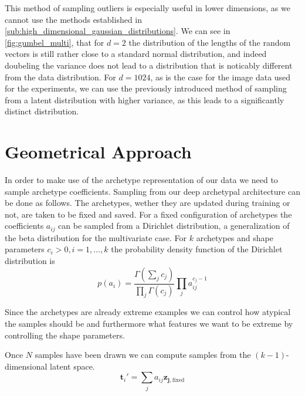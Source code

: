 This method of sampling outliers is especially useful in lower dimensions, as
we cannot use the methods established in
\autoref{sub:high_dimensional_gaussian_distributions}. We can see in
\autoref{fig:gumbel_multi}, that for $d=2$ the distribution of the lengths of
the random vectors is still rather close to a standard normal distribution, and
indeed doubeling the variance does not lead to a distribution that is noticably
different from the data distribution. For $d=1024$, as is the case for the
image data used for the experiments, we can use the previously introduced
method of sampling from a latent distribution with higher variance, as this
leads to a significantly distinct distribution.

\section{Geometrical Approach}%
\label{sec:geometrical_approach}


In order to make use of the archetype representation of our data we need to
sample archetype coefficients. Sampling from our deep archetypal architecture
can be done as follows. The archetypes, wether they are updated during training
or not, are taken to be fixed and saved. For a fixed configuration of
archetypes the coefficients $a_{ij}$ can be sampled from a Dirichlet distribution,
a generalization of the beta distribution for the multivariate case. For $k$
archetypes and shape parameters $c_i > 0, i = 1, \dots, k$ the probability
density function of the Dirichlet distribution is
\begin{equation}%
    \label{eq:dirichlet_pdf}
    p(a_i) = \frac{ \Gamma ( \sum_j c_j ) }{ \prod_j \Gamma (c_j) } \prod_j
    a_{ij}^{c_j - 1}
\end{equation}
\citep{forbesDirichletDistribution2010}

Since the archetypes are already extreme examples we can control how atypical
the samples should be and furthermore what features we want to be extreme by
controlling the shape parameters.

Once $N$ samples have been drawn we can compute samples from the
$(k-1)$-dimensional latent space.
\begin{equation}%
    \label{eq:aa_k_sample}
    \mathbf{t}_i' = \sum_j a_{ij} \mathbf{z_{j,\mathrm{fixed}}}
\end{equation}

